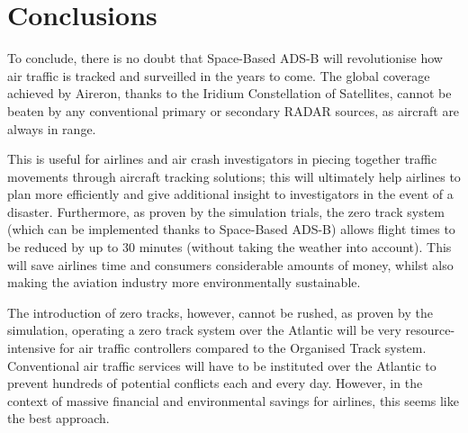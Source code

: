 \documentclass[stu, a4paper, 12pt, floatsintext]{apa7}
\numberwithin{figure}{section}
\numberwithin{table}{section}
\numberwithin{equation}{section}
\begin{document}
\newpage
\section{Conclusions}
To conclude, there is no doubt that Space-Based ADS-B will revolutionise how air traffic is tracked and surveilled in the years to come. The global coverage achieved by Aireron, thanks to the Iridium Constellation of Satellites, cannot be beaten by any conventional primary or secondary RADAR sources, as aircraft are always in range.

This is useful for airlines and air crash investigators in piecing together traffic movements through aircraft tracking solutions; this will ultimately help airlines to plan more efficiently and give additional insight to investigators in the event of a disaster. Furthermore, as proven by the simulation trials, the zero track system (which can be implemented thanks to Space-Based ADS-B) allows flight times to be reduced by up to 30 minutes (without taking the weather into account). This will save airlines time and consumers considerable amounts of money, whilst also making the aviation industry more environmentally sustainable. 

The introduction of zero tracks, however, cannot be rushed, as proven by the simulation, operating a zero track system over the Atlantic will be very resource-intensive for air traffic controllers compared to the Organised Track system. Conventional air traffic services will have to be instituted over the Atlantic to prevent hundreds of potential conflicts each and every day. However, in the context of massive financial and environmental savings for airlines, this seems like the best approach. 
\end{document}
